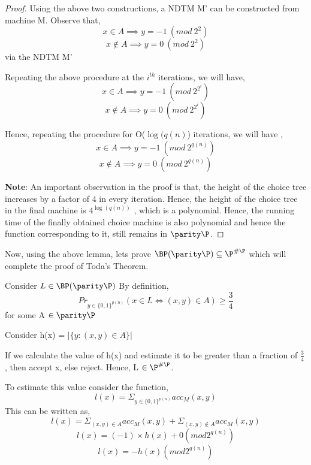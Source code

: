 \begin{proof}
  Using the above two constructions, a NDTM M' can be constructed from machine M. \newline \newline
  Observe that, \newline
   $$x \in A \implies y = -1~(mod~2^{2})$$ 
   $$x \notin A \implies y = 0~(mod~2^{2})$$ 
    via the NDTM M'
    
  Repeating the above procedure at the  $i^{th}$ iterations, we will have,
    $$x \in A \implies y = -1~(mod~2^{2^{i}})$$ 
    $$x \notin A \implies y = 0~(mod~2^{2^{i}})$$ 
    
  Hence, repeating the procedure for O($\log(q(n)$) iterations, we will have ,
    $$x \in A \implies y = -1~(mod~2^{q(n)})$$ 
    $$x \notin A \implies y = 0~(mod~2^{q(n)})$$ 
  
  
  \textbf{Note}: \newline
  An important observation in the proof is that, the height of the choice tree increases by a factor of 4 in every iteration. Hence, the height
  of the choice tree in the final machine is $4^{\log(q(n))}$ , which is a polynomial. Hence, the running time of the finally obtained choice machine
  is also polynomial and hence the function corresponding to it, still remains in $\parity \P$.
\end{proof}

Now, using the above lemma, lets prove $\BP(\parity\P) \subseteq \P^{\#\P}$ which will complete the proof of Toda's Theorem. \newline

Consider $L \in \BP(\parity\P)$ \newline
By definition,
$$ Pr_{y\in \{0,1\}^{p(n)}} (x \in L \Leftrightarrow (x,y) \in A) \geq \frac{3}{4}$$ for some A $\in \parity \P$ \newline

Consider h(x) = $|\{y:(x,y) \in A\}|$ \newline

If we calculate the value of h(x) and estimate it to be greater than a fraction of $\frac{3}{4}$ , then accept x, else reject.\newline
Hence, L $\in \P^{\#\P}$. \newline

To estimate this value consider the function,
$$ l(x) = \Sigma_{y\in \{0,1\}^{p(n)}} acc_{M}(x,y)$$
This can be written as,
$$ l(x) = \Sigma_{(x,y) \in A} acc_{M}(x,y) + \Sigma_{(x,y) \notin A} acc_{M}(x,y)$$
$$ l(x) = (-1) \times h(x) + 0 (mod 2^{q(n)})$$
$$ l(x) = -h(x) (mod 2^{q(n)})$$

